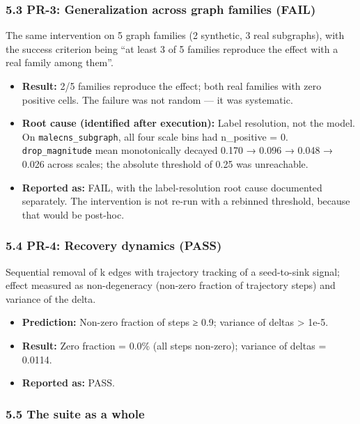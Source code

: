 \documentclass[
]{article}
\providecommand{\tightlist}{%
  \setlength{\itemsep}{0pt}\setlength{\parskip}{0pt}}
\begin{document}
\subsubsection{5.3 PR-3: Generalization across graph families
(FAIL)}\label{pr-3-generalization-across-graph-families-fail}

The same intervention on 5 graph families (2 synthetic, 3 real
subgraphs), with the success criterion being ``at least 3 of 5 families
reproduce the effect with a real family among them''.

\begin{itemize}
\tightlist
\item
  \textbf{Result:} 2/5 families reproduce the effect; both real families
  with zero positive cells. The failure was not random --- it was
  systematic.
\item
  \textbf{Root cause (identified after execution):} Label resolution,
  not the model. On \texttt{malecns\_subgraph}, all four scale bins had
  n\_positive = 0. \texttt{drop\_magnitude} mean monotonically decayed
  0.170 → 0.096 → 0.048 → 0.026 across scales; the absolute threshold of
  0.25 was unreachable.
\item
  \textbf{Reported as:} FAIL, with the label-resolution root cause
  documented separately. The intervention is not re-run with a rebinned
  threshold, because that would be post-hoc.
\end{itemize}

\subsubsection{5.4 PR-4: Recovery dynamics
(PASS)}\label{pr-4-recovery-dynamics-pass}

Sequential removal of k edges with trajectory tracking of a seed-to-sink
signal; effect measured as non-degeneracy (non-zero fraction of
trajectory steps) and variance of the delta.

\begin{itemize}
\tightlist
\item
  \textbf{Prediction:} Non-zero fraction of steps ≥ 0.9; variance of
  deltas \textgreater{} 1e-5.
\item
  \textbf{Result:} Zero fraction = 0.0\% (all steps non-zero); variance
  of deltas = 0.0114.
\item
  \textbf{Reported as:} PASS.
\end{itemize}

\subsubsection{5.5 The suite as a whole}\label{the-suite-as-a-whole}
\end{document}

